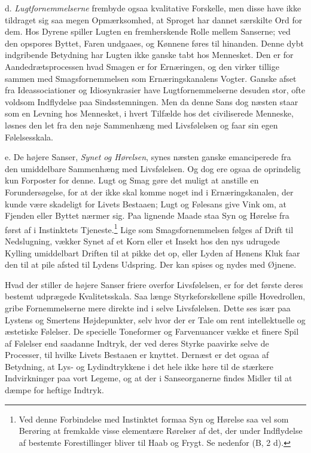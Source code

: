 \documentclass[12pt,a4paper,openany]{book}
\newcommand{\opage}[1]{\marginnote{\footnotesize\textit{[#1]}}}
\begin{document}
d. \emph{Lugtfornemmelserne} frembyde ogsaa kvalitative Forskelle, men
disse have ikke tildraget sig saa megen Opmærksomhed, at Sproget har
dannet særskilte Ord for dem. Hos Dyrene spiller Lugten en fremherskende
Rolle mellem Sanserne; ved den opspores Byttet, Faren undgaaes, og
Kønnene føres til hinanden. Denne dybt indgribende Betydning har Lugten
ikke ganske tabt hos Mennesket. Den er for Aandedrætsprocessen hvad
Smagen er for Ernæringen, og den virker tillige sammen med
Smagsfornemmelsen som Ernæringskanalens Vogter. Ganske afset fra
Ideassociationer og Idiosynkrasier have Lugtfornemmelserne desuden stor,
ofte voldsom Indflydelse paa Sindsstemningen. Men da denne Sans dog
næsten staar som en Levning hos Mennesket, i hvert Tilfælde hos det
civiliserede Menneske, løsnes den let fra den nøje Sammenhæng med
Livsfølelsen og faar sin egen Følelsesskala.

e. De højere Sanser, \emph{Synet og Hørelsen}, synes næsten ganske
emanciperede fra den umiddelbare Sammenhæng med Livsfølelsen. Og dog ere
ogsaa de oprindelig kun Forposter for denne. Lugt og Smag gøre det
muligt at anstille en Forundersøgelse, for at der ikke skal komme noget
ind i Ernæringskanalen, der kunde være skadeligt for Livets Bestaaen;
Lugt og Følesans give Vink om, at Fjenden eller Byttet nærmer sig. Paa
lignende Maade staa Syn og Hørelse fra først af i Instinktets
Tjeneste.\footnote[1]{Ved denne Forbindelse med Instinktet formaa Syn og
Hørelse saa vel som Berøring at fremkalde visse elementære Rørelser af
det, der under Indflydelse af bestemte Forestillinger bliver til Haab og
Frygt. Se nedenfor (B, 2 d).} Lige som Smagsfornemmelsen følges af Drift
til Nedslugning, vækker Synet af et Korn eller et Insekt hos den nys
udrugede Kylling umiddelbart Driften til at pikke det op, eller Lyden af
Hønens Kluk faar den til at pile afsted til Lydens Udspring. Der kan
spises og nydes med Øjnene.

Hvad der stiller de højere Sanser friere overfor Livsfølelsen, er for
det første deres bestemt udprægede Kvalitetsskala. Saa længe
Styrkeforskellene spille Hovedrollen, gribe
\opage{277}Fornemmelserne mere direkte ind i selve Livsfølelsen. Dette
ses især paa Lystens og Smertens Højdepunkter, selv hvor der er Tale om
rent intellektuelle og æstetiske Følelser. De specielle Toneformer og
Farvenuancer vække et finere Spil af Følelser end saadanne Indtryk, der
ved deres Styrke paavirke selve de Processer, til hvilke Livets Bestaaen
er knyttet. Dernæst er det ogsaa af Betydning, at Lys- og Lydindtrykkene
i det hele ikke høre til de stærkere Indvirkninger paa vort Legeme, og
at der i Sanseorganerne findes Midler til at dæmpe for heftige Indtryk.
\end{document}
